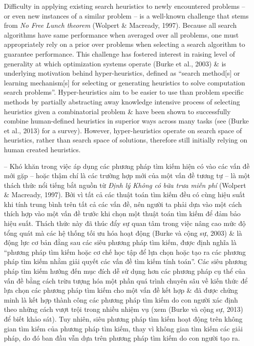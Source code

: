 \documentclass{article}
\begin{document}
\begin{itemize}
    Difficulty in applying existing search heuristics to newly encountered problems -- or even new instances of a similar problem -- is a well-known challenge that stems from {\it No Free Lunch theorem} (Wolpert \& Macready, 1997). Because all search algorithms have same performance when averaged over all problems, one must appropriately rely on a prior over problems when selecting a search algorithm to guarantee performance. This challenge has fostered interest in raising level of generality at which optimization systems operate (Burke et al., 2003) \& is underlying motivation behind hyper-heuristics, defined as ``search method[s] or learning mechanism[s] for selecting or generating heuristics to solve computation search problems''. Hyper-heuristics aim to be easier to use than problem specific methods by partially abstracting away knowledge intensive process of selecting heuristics given a combinatorial problem \& have been shown to successfully combine human-defined heuristics in superior ways across many tasks (see (Burke et al., 2013) for a survey). However, hyper-heuristics operate on search space of heuristics, rather than search space of solutions, therefore still initially relying on human created heuristics.
    
    -- Khó khăn trong việc áp dụng các phương pháp tìm kiếm hiện có vào các vấn đề mới gặp -- hoặc thậm chí là các trường hợp mới của một vấn đề tương tự -- là một thách thức nổi tiếng bắt nguồn từ {\it Định lý Không có bữa trưa miễn phí} (Wolpert \& Macready, 1997). Bởi vì tất cả các thuật toán tìm kiếm đều có cùng hiệu suất khi tính trung bình trên tất cả các vấn đề, nên người ta phải dựa vào một cách thích hợp vào một vấn đề trước khi chọn một thuật toán tìm kiếm để đảm bảo hiệu suất. Thách thức này đã thúc đẩy sự quan tâm trong việc nâng cao mức độ tổng quát mà các hệ thống tối ưu hóa hoạt động (Burke và cộng sự, 2003) \& là động lực cơ bản đằng sau các siêu phương pháp tìm kiếm, được định nghĩa là ``phương pháp tìm kiếm hoặc cơ chế học tập để lựa chọn hoặc tạo ra các phương pháp tìm kiếm nhằm giải quyết các vấn đề tìm kiếm tính toán''. Các siêu phương pháp tìm kiếm hướng đến mục đích dễ sử dụng hơn các phương pháp cụ thể của vấn đề bằng cách trừu tượng hóa một phần quá trình chuyên sâu về kiến thức để lựa chọn các phương pháp tìm kiếm cho một vấn đề kết hợp \& đã được chứng minh là kết hợp thành công các phương pháp tìm kiếm do con người xác định theo những cách vượt trội trong nhiều nhiệm vụ (xem (Burke và cộng sự, 2013) để biết khảo sát). Tuy nhiên, siêu phương pháp tìm kiếm hoạt động trên không gian tìm kiếm của phương pháp tìm kiếm, thay vì không gian tìm kiếm các giải pháp, do đó ban đầu vẫn dựa trên phương pháp tìm kiếm do con người tạo ra.
\end{itemize}
\end{document}
